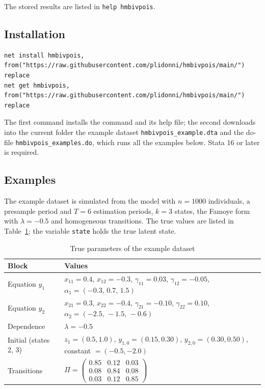 \documentclass[11pt,a4paper]{article}
\newcommand{\cmd}[1]{\texttt{#1}}
\begin{document}
The stored results are listed in \cmd{help hmbivpois}.

\subsection{Installation}

\begin{lstlisting}
net install hmbivpois, from("https://raw.githubusercontent.com/plidonni/hmbivpois/main/") replace
net get hmbivpois, from("https://raw.githubusercontent.com/plidonni/hmbivpois/main/") replace
\end{lstlisting}
The first command installs the command and its help file; the second downloads into the current
folder the example dataset \cmd{hmbivpois\_example.dta} and the do-file \cmd{hmbivpois\_examples.do},
which runs all the examples below. Stata 16 or later is required.

\subsection{Examples}

The example dataset is simulated from the model with $n=1000$ individuals, a presample period and
$T=6$ estimation periods, $k=3$ states, the Famoye form with $\lambda=-0.5$ and homogeneous
transitions. The true values are listed in Table~\ref{tab:true}; the variable \cmd{state} holds the
true latent state.

\begin{table}[h]
\centering\small
\caption{True parameters of the example dataset}\label{tab:true}
\begin{tabular}{ll}
\toprule
Block & Values\\
\midrule
Equation $y_1$ & $x_{11}=0.4$, $x_{12}=-0.3$, $\gamma_{11}=0.03$, $\gamma_{12}=-0.05$, $\alpha_{1}=(-0.3,\,0.7,\,1.5)$\\
Equation $y_2$ & $x_{21}=0.3$, $x_{22}=-0.4$, $\gamma_{21}=-0.10$, $\gamma_{22}=0.10$, $\alpha_{2}=(-2.5,\,-1.5,\,-0.6)$\\
Dependence & $\lambda=-0.5$\\
Initial (states 2, 3) & $z_1=(0.5,1.0)$, $y_{1,0}=(0.15,0.30)$, $y_{2,0}=(0.30,0.50)$, constant $=(-0.5,-2.0)$\\
Transitions & $\Pi=\begin{pmatrix}0.85&0.12&0.03\\0.08&0.84&0.08\\0.03&0.12&0.85\end{pmatrix}$\\
\bottomrule
\end{tabular}
\end{table}
\end{document}
